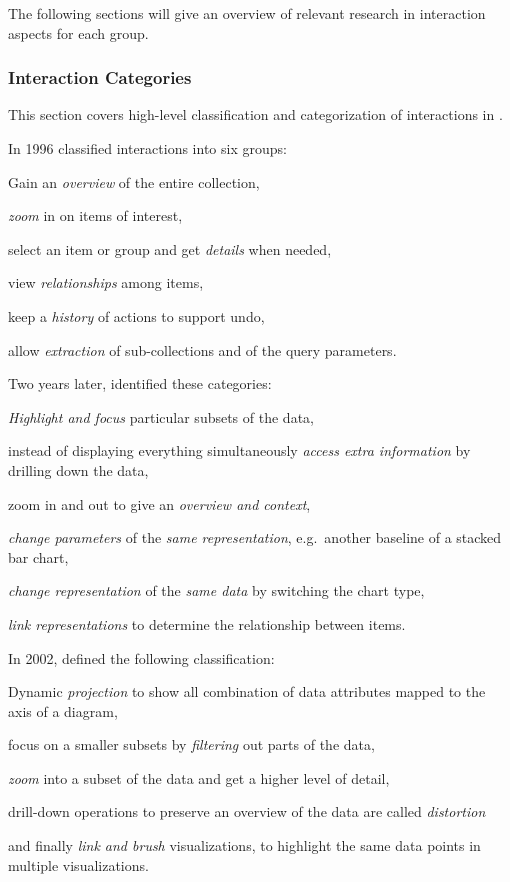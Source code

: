 The following sections will give an overview of relevant research in interaction aspects for each group.

\subsubsection{Interaction Categories}\label{sec:related-work:interaction-aspects:categories}
This section covers high-level classification and categorization of interactions in \cmvs{}.

In 1996 \textcite{Shneiderman1996} classified interactions into six groups:
\begin{enumerate*}[label=(\arabic*)]
  \item
    Gain an \emph{overview} of the entire collection,
  \item
    \emph{zoom} in on items of interest,
  \item
    select an item or group and get \emph{details} when needed,
  \item
    view \emph{relationships} among items,
  \item
    keep a \emph{history} of actions to support undo,
  \item
    allow \emph{extraction} of sub-collections and of the query parameters.
\end{enumerate*}

Two years later, \textcite{Dix1998} identified these categories:
\begin{enumerate*}[label=(\arabic*)]
  \item
    \emph{Highlight and focus} particular subsets of the data,
  \item
    instead of displaying everything simultaneously \emph{access extra information} by drilling down the data,
  \item
    zoom in and out to give an \emph{overview and context},
  \item
    \emph{change parameters} of the \emph{same representation}, e.g.\ another baseline of a stacked bar chart,
  \item
    \emph{change representation} of the \emph{same data} by switching the chart type,
  \item
    \emph{link representations} to determine the relationship between items.
\end{enumerate*}

In 2002, \textcite{Keim2002} defined the following classification:
\begin{enumerate*}[label=(\arabic*)]
  \item
    Dynamic \emph{projection} to show all combination of data attributes mapped to the axis of a diagram,
  \item
    focus on a smaller subsets by \emph{filtering} out parts of the data,
  \item
    \emph{zoom} into a subset of the data and get a higher level of detail,
  \item
     drill-down operations to preserve an overview of the data are called \emph{distortion}
  \item
    and finally \emph{link and brush} visualizations, to highlight the same data points in multiple visualizations.
\end{enumerate*}

